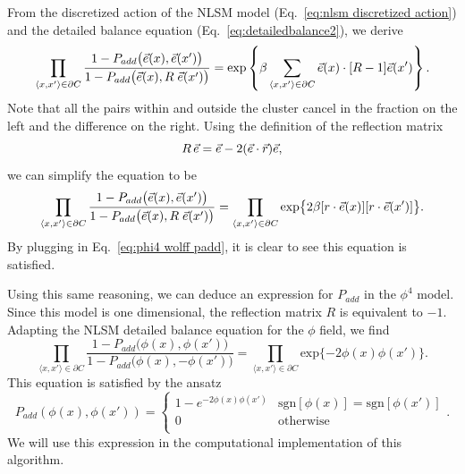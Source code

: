 From the discretized action of the NLSM model (Eq.~\ref{eq:nlsm discretized action}) and the detailed balance equation (Eq.~\ref{eq:detailedbalance2}), we derive
\begin{equation}
    \prod_{\langle x,x'\rangle \in \partial C}  \frac{ 1 - P_{add}\big(\vec e(x),\vec e(x')\big)}{ 1 - P_{add}\big(\vec e(x),R\;\vec e(x')\big)}  = \mathrm{exp}\left\{\beta\sum_{\langle x,x'\rangle \in \partial C} \vec e(x)\cdot[R-1]\vec e(x')\right\}.
\end{equation}
Note that all the pairs within and outside the cluster cancel in the fraction on the left and the difference on the right. Using the definition of the reflection matrix
\begin{equation}
    R\,\vec e = \vec e - 2(\vec e\cdot\vec{r})\vec e,
\end{equation}
we can simplify the equation to be 
\begin{equation}
    \prod_{\langle x,x'\rangle \in \partial C}  \frac{ 1 - P_{add}\big(\vec e(x),\vec e(x')\big)}{ 1 - P_{add}\big(\vec e(x),R\;\vec e(x')\big)}  = \prod_{\langle x,x'\rangle \in \partial C}\mathrm{exp}\big\{2\beta[r\cdot\vec e(x)][r\cdot\vec e(x')]\big\}.
\end{equation}
By plugging in Eq.~\ref{eq:phi4 wolff padd}, it is clear to see this equation is satisfied.

Using this same reasoning, we can deduce an expression for $P_{add}$ in the $\phi^4$ model. Since this model is one dimensional, the reflection matrix $R$ is equivalent to $-1$. Adapting the NLSM detailed balance equation for the $\phi$ field, we find
\begin{equation}
    \prod_{\langle x,x'\rangle \in \partial C}  \frac{ 1 - P_{add}\big(\phi(x),\phi(x')\big)}{ 1 - P_{add}\big(\phi(x),-\phi(x')\big)}  = \prod_{\langle x,x'\rangle \in \partial C}\mathrm{exp}\{-2 \phi(x)\phi(x')\}.
\end{equation}
This equation is satisfied by the ansatz
\begin{equation}
    \label{eq:nlsm wolff padd}
    P_{add}(\phi(x),\phi(x')) = \begin{cases} 
        1 - e^{-2\phi(x)\phi(x')} & \mathrm{sgn}[\phi(x)]=\mathrm{sgn}[\phi(x')]\\
        0 & \mathrm{otherwise} \\
   \end{cases}.
\end{equation}
We will use this expression in the computational implementation of this algorithm.

